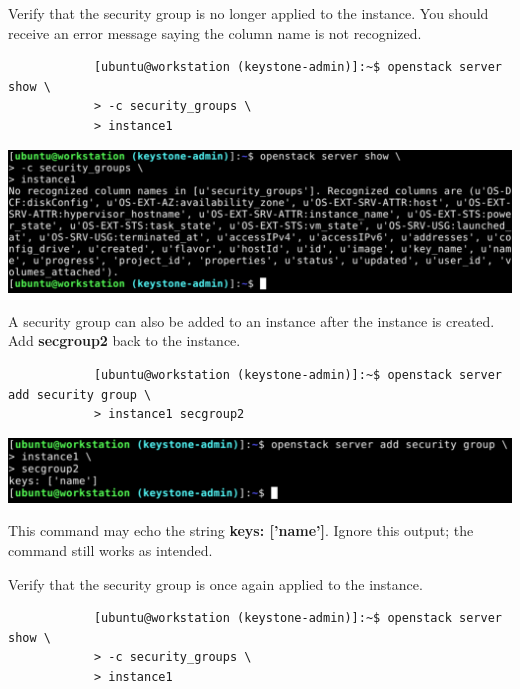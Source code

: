 \documentclass[letterpaper, 12pt]{article}
\begin{document}
\begin{enumerate}
    \begin{labstep}
        Verify that the security group is no longer applied to the instance.
        You should receive an error message saying the column name is not recognized.
        \begin{lstlisting}
            [ubuntu@workstation (keystone-admin)]:~$ openstack server show \
            > -c security_groups \
            > instance1
        \end{lstlisting}

        \begin{center}
            \includegraphics[width=\linewidth]{images/part6/step5.png}
        \end{center}
    \end{labstep}

    \begin{labstep}
        A security group can also be added to an instance after the instance is created.
        Add \textbf{secgroup2} back to the instance.
        \begin{lstlisting}
            [ubuntu@workstation (keystone-admin)]:~$ openstack server add security group \
            > instance1 secgroup2
        \end{lstlisting}

        \begin{center}
            \includegraphics[width=\linewidth]{images/part6/step6.png}
        \end{center}
    \end{labstep}

    \begin{notebox}
        This command may echo the string \textbf{keys: ['name']}.
        Ignore this output; the command still works as intended.
    \end{notebox}

    \begin{labstep}
        Verify that the security group is once again applied to the instance.
        \begin{lstlisting}
            [ubuntu@workstation (keystone-admin)]:~$ openstack server show \
            > -c security_groups \
            > instance1
        \end{lstlisting}


\end{labstep}
\end{enumerate}
\end{document}
